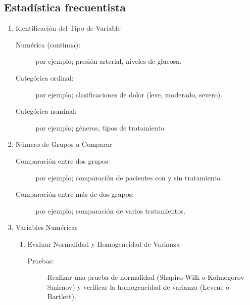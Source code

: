 \documentclass[12pt,letterpaper,spanish, twoside]{article}
\begin{document}
\subsection{Estadística frecuentista}
\begin{enumerate}
    \item Identificación del Tipo de Variable
    \begin{description}
        \item[Numérica (continua):] por ejemplo; presión arterial, niveles de glucosa.
        \item[Categórica ordinal:] por ejemplo; clasificaciones de dolor (leve, moderado, severo).
        \item[Categórica nominal:] por ejemplo; géneros, tipos de tratamiento.
    \end{description}

    \item Número de Grupos a Comparar
    \begin{description}
        \item[Comparación entre dos grupos:] por ejemplo; comparación de pacientes con y sin tratamiento.
        \item[Comparación entre más de dos grupos:] por ejemplo; comparación de varios tratamientos.
    \end{description}

    \item Variables Numéricas
    \begin{enumerate}
        \item Evaluar Normalidad y Homogeneidad de Varianza
        \begin{description}
            \item[Pruebas:] Realizar una prueba de normalidad (Shapiro-Wilk o Kolmogorov-Smirnov) y verificar la homogeneidad de varianza (Levene o Bartlett).
        \end{description}


\end{enumerate}
\end{enumerate}
\end{document}
